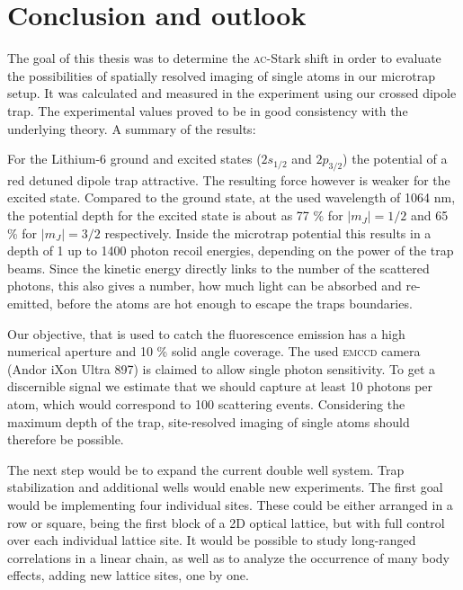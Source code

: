 \chapter{Conclusion and outlook}

The goal of this thesis was to determine the \textsc{ac}-Stark shift in order to evaluate the possibilities of spatially resolved imaging of single atoms in our microtrap setup. It was calculated and measured in the experiment using our crossed dipole trap. The experimental values proved to be in good consistency with the underlying theory. A summary of the results:

For the Lithium-6 ground and excited states ($2s_{1/2}$ and $2p_{3/2}$) the potential of a red detuned dipole trap attractive. The resulting force however is weaker for the excited state. Compared to the ground state, at the used wavelength of 1064 nm, the potential depth for the excited state is  about as 77 \% for $|m_J|=1/2$ and 65 \% for $|m_J|=3/2$ respectively. Inside the microtrap potential this results in a depth of 1 up to 1400 photon recoil energies, depending on the power of the trap beams. Since the kinetic energy directly links to the number of the scattered photons, this also gives a number, how much light can be absorbed and re-emitted, before the atoms are hot enough to escape the traps boundaries. 

Our objective, that is used to catch the fluorescence emission has a high numerical aperture and 10 \% solid angle coverage. The used \textsc{emccd} camera (Andor iXon Ultra 897) is claimed to allow single photon sensitivity. To get a discernible signal we estimate that we should capture at least 10 photons per atom, which would correspond to 100 scattering events. Considering the maximum depth of the trap, site-resolved imaging of single atoms should therefore be possible.

The next step would be to expand the current double well system. Trap stabilization and additional wells would enable new experiments. The first goal would be implementing four individual sites. These could be either arranged in a row or square, being the first block of a 2D optical lattice, but with full control over each individual lattice site. It would be possible to study long-ranged correlations in a linear chain, as well as to analyze the occurrence of many body effects, adding new lattice sites, one by one. 





%
